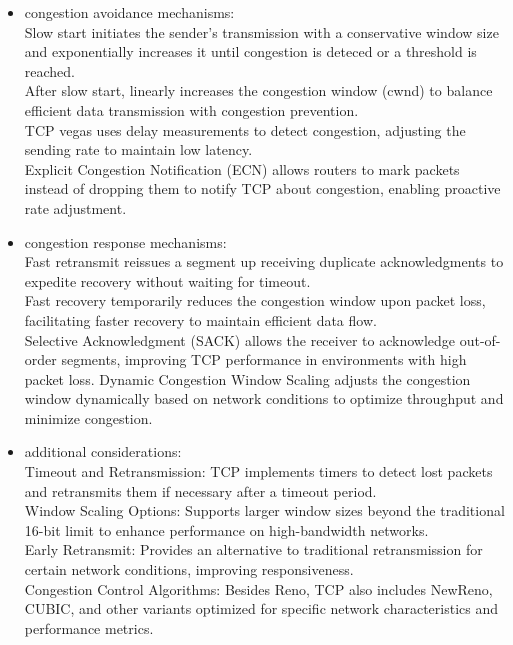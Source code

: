 \documentclass{article}
\begin{document}
\begin{itemize}
	\item[] congestion avoidance mechanisms:\\
		Slow start initiates the sender's transmission with a conservative window size and exponentially increases it until congestion is deteced or a threshold is reached.\\
		After slow start, linearly increases the congestion window (cwnd) to balance efficient data transmission with congestion prevention.\\
		TCP vegas uses delay measurements to detect congestion, adjusting the sending rate to maintain low latency.\\
		Explicit Congestion Notification (ECN) allows routers to mark packets instead of dropping them to notify TCP about congestion, enabling proactive rate adjustment.
	\item[] congestion response mechanisms:\\
		Fast retransmit reissues a segment up receiving duplicate acknowledgments to expedite recovery without waiting for timeout.\\
		Fast recovery temporarily reduces the congestion window upon packet loss, facilitating faster recovery to maintain efficient data flow.\\
		Selective Acknowledgment (SACK) allows the receiver to acknowledge out-of-order segments, improving TCP performance in environments with high packet loss.
		Dynamic Congestion Window Scaling adjusts the congestion window dynamically based on network conditions to optimize throughput and minimize congestion.\\
	\item[] additional considerations:\\
		Timeout and Retransmission: TCP implements timers to detect lost packets and retransmits them if necessary after a timeout period.\\
		Window Scaling Options: Supports larger window sizes beyond the traditional 16-bit limit to enhance performance on high-bandwidth networks.\\
		Early Retransmit: Provides an alternative to traditional retransmission for certain network conditions, improving responsiveness.\\
		Congestion Control Algorithms: Besides Reno, TCP also includes NewReno, CUBIC, and other variants optimized for specific network characteristics and performance metrics.\\

\end{itemize}
\end{document}
